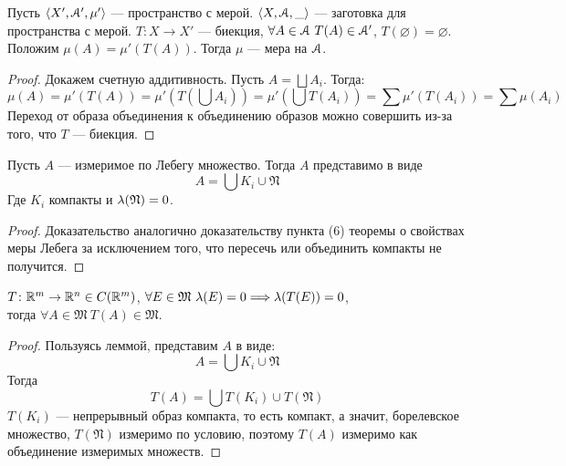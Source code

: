 \begin{lemma}

    Пусть $\langle X', \mathcal{A}', \mu' \rangle$ --- пространство с мерой.
    $\langle X, \mathcal{A}, \_ \rangle$ --- заготовка для пространства с мерой.
    $T \colon X \to X'$ --- биекция, $\forall A \in \mathcal{A}~ T(A) \in \mathcal{A}'$,
    $T(\varnothing) = \varnothing$. Положим $\mu(A) = \mu'(T(A))$. Тогда
    $\mu$ --- мера на $\mathcal{A}$.
\end{lemma}
\begin{proof}
	Докажем счетную аддитивность. Пусть $A = \bigsqcup{A_i}$. Тогда:
\[
	\mu(A) = \mu'(T(A)) = \mu'\left(T\left(\bigcup{A_i}\right)\right) 
	= \mu'\left(\bigcup{T(A_i)}\right) 
	= \sum{\mu'(T(A_i))} = \sum{\mu(A_i)}
\]
	Переход от образа объединения к объединению образов можно совершить из-за 
	того, что $T$ --- биекция.
\end{proof}

\begin{lemma}
	Пусть $A$ --- измеримое по Лебегу множество. Тогда $A$ представимо в виде 
\[
	A = \bigcup{K_i} \cup \mathfrak{N}
\]
	Где $K_i$ компакты и $\lambda(\mathfrak{N}) = 0$.
\end{lemma}
\begin{proof}
	Доказательство аналогично доказательству пункта (6) теоремы о свойствах меры Лебега 
	за исключением того, что пересечь или объединить компакты не получится.
\end{proof}

\begin{lemma}
    $T \colon \mathbb{R}^m \to \mathbb{R}^n \in C(\mathbb{R}^m)$, $\forall E \in \mathfrak{M}~ \lambda(E) = 0
    \Longrightarrow \lambda(T(E)) = 0$, \\ тогда $\forall A \in \mathfrak{M}~ T(A) \in \mathfrak{M}$.
\end{lemma}
\begin{proof}
	Пользуясь леммой, представим $A$ в виде:
\[
	A = \bigcup{K_i} \cup \mathfrak{N}
\]
	Тогда
\[
	T(A) = \bigcup{T(K_i)} \cup T(\mathfrak{N})
\]
	$T(K_i)$ --- непрерывный образ компакта, то есть компакт, а значит, борелевское множество,
	$T(\mathfrak{N})$ измеримо по условию, поэтому $T(A)$ измеримо как объединение измеримых 
	множеств.
\end{proof}

